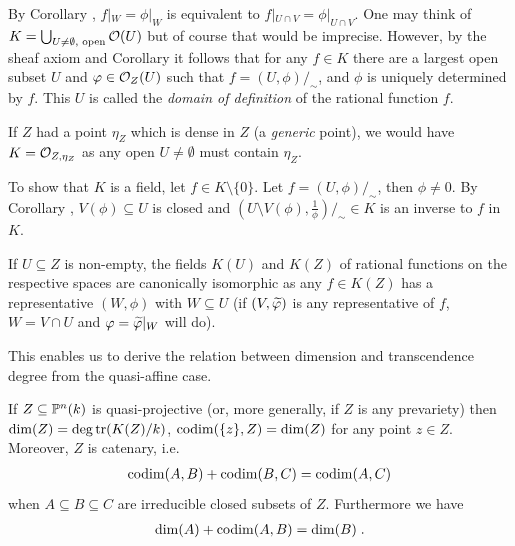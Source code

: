 \documentclass[a4paper,parskip=half,numbers=enddot, DIV=12]{scrreprt}
\begin{document}
\begin{rem*}
    \begin{alphanumerate}
        \item 
            By Corollary , $f|_W = \phi|_W$ is equivalent to $f|_{U\cap V} = \phi|_{U\cap V}$. One may think of $K=\bigcup_{U\neq\emptyset,\text{ open}} \mathcal{O}(U)$ but of course that would be imprecise. However, by the sheaf axiom and Corollary  it follows that for any $f\in K$ there are a largest open subset $U$ and $\varphi \in \mathcal{O}_Z(U)$ such that $f=(U,\phi)/_\sim$, and $\phi$ is uniquely determined by $f$. This $U$ is called the \emph{domain of definition} of the rational function $f$.
        \item 
            If $Z$ had a point $\eta_Z$ which is dense in $Z$ (a \emph{generic} point), we would have $K = \mathcal{O}_{Z,\eta_Z}$ as any open $U\neq \emptyset$ must contain $\eta_Z$.
        \item
            To show that $K$ is a field, let $f\in K\setminus \{0\}$. Let $f=(U,\phi)/_\sim$, then $\phi\neq 0$. By Corollary , $V(\phi)\subseteq U$ is closed and $\left(U\setminus V(\phi), \frac{1}{\phi}\right)/_\sim \in K$ is an inverse to $f$ in $K$.
        \item 
            If $U\subseteq Z$ is non-empty, the fields $K(U)$ and $K(Z)$ of rational functions on the respective spaces are canonically isomorphic as any $f\in K(Z)$ has a representative $(W,\phi)$ with $W\subseteq U$ (if $(V,\snake\phi)$ is any representative of $f$, $W=V\cap U$ and $\phi=\snake \phi|_W$ will do).
    \end{alphanumerate}
\end{rem*}
This enables us to derive the relation between dimension and transcendence degree from the quasi-affine case.
\begin{prop}
    If $Z\subseteq \mathbb{P}^n(k)$ is quasi-projective (or, more generally, if $Z$ is any prevariety) then $\dim(Z) = \deg\operatorname{tr}(K(Z)/k)$, $\operatorname{codim}(\{z\},Z) = \dim(Z)$ for any point $z\in Z$. Moreover, $Z$ is catenary, i.e.
    \begin{align*}
        \operatorname{codim}(A,B) +\operatorname{codim}(B,C) = \operatorname{codim}(A,C)
    \end{align*}
    when $A\subseteq B\subseteq C$ are irreducible closed subsets of $Z$. Furthermore we have
    \begin{align*}
        \dim(A) +\operatorname{codim}(A,B) = \dim(B)\;.
    \end{align*}
\end{prop}
\end{document}
